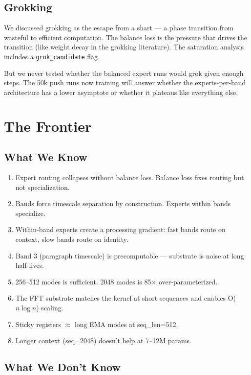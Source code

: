 \documentclass[11pt,a4paper]{report}
\begin{document}
\section{Grokking}

We discussed grokking as the escape from a shart --- a phase transition from wasteful to efficient computation. The balance loss is the pressure that drives the transition (like weight decay in the grokking literature). The saturation analysis includes a \texttt{grok\_candidate} flag.

But we never tested whether the balanced expert runs would grok given enough steps. The 50k push runs now training will answer whether the experts-per-band architecture has a lower asymptote or whether it plateaus like everything else.

\chapter{The Frontier}

\section{What We Know}

\begin{enumerate}[nosep]
\item Expert routing collapses without balance loss. Balance loss fixes routing but not specialization.
\item Bands force timescale separation by construction. Experts within bands specialize.
\item Within-band experts create a processing gradient: fast bands route on context, slow bands route on identity.
\item Band 3 (paragraph timescale) is precomputable --- substrate is noise at long half-lives.
\item 256--512 modes is sufficient. 2048 modes is 85$\times$ over-parameterized.
\item The FFT substrate matches the kernel at short sequences and enables O($n \log n$) scaling.
\item Sticky registers $\approx$ long EMA modes at seq\_len=512.
\item Longer context (seq=2048) doesn't help at 7--12M params.
\end{enumerate}

\section{What We Don't Know}
\end{document}
